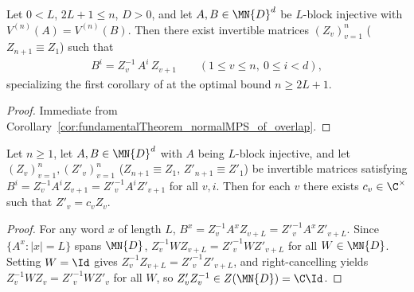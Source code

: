 \begin{corollary}%
    \label{cor:fundamentalTheorem_normalMPS}
    \leanok
    Let $0 < L$, $2L + 1 \le n$, $D>0$, and let $A,B\in\MN{D}^d$ be $L$-block
    injective with $V^{(n)}(A)=V^{(n)}(B)$. Then there exist invertible matrices
    $(Z_v)_{v=1}^n$ ($Z_{n+1}\equiv Z_1$) such that
    \begin{align}
        B^i = Z_v^{-1}\, A^i\, Z_{v+1}
        \qquad (1\le v\le n,\ 0\le i<d),
        \label{eq:peps_normal_mps_per_bond}
    \end{align}
    specializing the first corollary of \cite[Section~4]{Molnar2018NormalPEPS}
    at the optimal bound $n\ge 2L+1$.
\end{corollary}
\begin{proof}\leanok
    Immediate from Corollary~\ref{cor:fundamentalTheorem_normalMPS_of_overlap}.
\end{proof}

\begin{lemma}%
    \label{lem:gaugeFamily_bond_proportional}
    \leanok
    Let $n\ge 1$, let $A,B\in\MN{D}^d$ with $A$ being $L$-block injective, and
    let $(Z_v)_{v=1}^n,(Z'_v)_{v=1}^n$ ($Z_{n+1}\equiv Z_1$, $Z'_{n+1}\equiv Z'_1$)
    be invertible matrices satisfying $B^i = Z_v^{-1} A^i Z_{v+1} = Z'^{-1}_v A^i Z'_{v+1}$
    for all $v,i$. Then for each $v$ there exists $c_v\in\C^\times$ such that
    $Z'_v = c_v Z_v$.
\end{lemma}
\begin{proof}\leanok
    For any word $x$ of length $L$,
    $B^x = Z_v^{-1} A^x Z_{v+L} = Z'^{-1}_v A^x Z'_{v+L}$. Since $\{A^x:|x|=L\}$
    spans $\MN{D}$, $Z_v^{-1} W Z_{v+L} = Z'^{-1}_v W Z'_{v+L}$ for all
    $W\in\MN{D}$. Setting $W=\Id$ gives $Z_v^{-1} Z_{v+L} = Z'^{-1}_v Z'_{v+L}$,
    and right-cancelling yields $Z_v^{-1} W Z_v = Z'^{-1}_v W Z'_v$ for all $W$,
    so $Z'_v Z_v^{-1}\in Z(\MN{D})=\C\Id$.
\end{proof}

